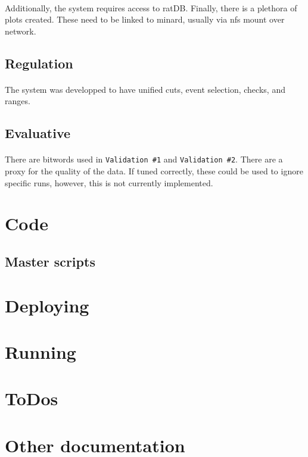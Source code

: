 \documentclass[12pt]{article}
\begin{document}
\paragraph{}
Additionally, the system requires access to ratDB. Finally, there is a plethora of plots created. These need to be linked to minard, usually via nfs mount over network.

\subsection{Regulation}
\paragraph{}
The system was developped to have unified cuts, event selection, checks, and ranges.

\subsection{Evaluative}
\paragraph{}
There are bitwords used in \texttt{Validation \#1} and \texttt{Validation \#2}. There are a proxy for the quality of the data. If tuned correctly, these could be used to ignore specific runs, however, this is not currently implemented.

\clearpage

\section{Code}
\subsection{Master scripts}

\section{Deploying}

\section{Running}

\section{ToDos}

\section{Other documentation}
\end{document}
